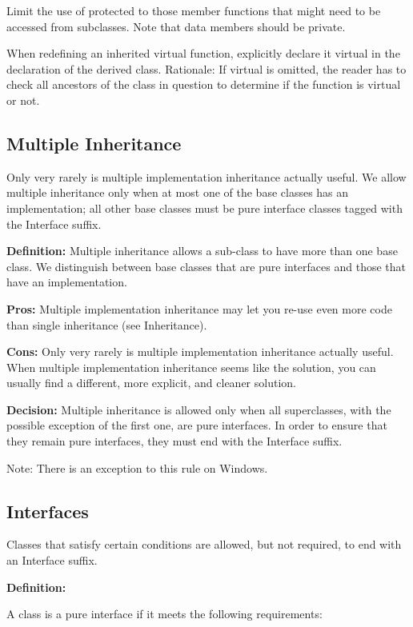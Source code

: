 Limit the use of protected to those member functions that might need to be accessed from subclasses. Note that data members should be private.

When redefining an inherited virtual function, explicitly declare it virtual in the declaration of the derived class. Rationale\+: If virtual is omitted, the reader has to check all ancestors of the class in question to determine if the function is virtual or not.

\subsection*{Multiple Inheritance}

Only very rarely is multiple implementation inheritance actually useful. We allow multiple inheritance only when at most one of the base classes has an implementation; all other base classes must be pure interface classes tagged with the Interface suffix.

{\bfseries Definition\+:} Multiple inheritance allows a sub-\/class to have more than one base class. We distinguish between base classes that are pure interfaces and those that have an implementation.

{\bfseries Pros\+:} Multiple implementation inheritance may let you re-\/use even more code than single inheritance (see Inheritance).

{\bfseries Cons\+:} Only very rarely is multiple implementation inheritance actually useful. When multiple implementation inheritance seems like the solution, you can usually find a different, more explicit, and cleaner solution.

{\bfseries Decision\+:} Multiple inheritance is allowed only when all superclasses, with the possible exception of the first one, are pure interfaces. In order to ensure that they remain pure interfaces, they must end with the Interface suffix.

Note\+: There is an exception to this rule on Windows.

\subsection*{Interfaces}

Classes that satisfy certain conditions are allowed, but not required, to end with an {\ttfamily Interface} suffix.

{\bfseries Definition\+:}

A class is a pure interface if it meets the following requirements\+:


